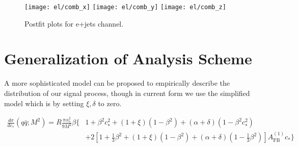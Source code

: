 \begin{figure}[hbt]
  \begin{center}
    \texttt{[image: el/comb\_x]}
    \texttt{[image: el/comb\_y]}
    \texttt{[image: el/comb\_z]}
  \caption{\small Postfit plots for e+jets channel.}
    \label{fig:el_postfit}
  \end{center}
\end{figure}



\clearpage
\section{Generalization of Analysis Scheme}
A more sophisticated model can be proposed to empirically describe the distribution of our signal process, though in current form we use the simplified model which is by setting $\xi,\delta$ to zero.

\begin{align}
\frac{d\sigma}{dc_*}(q\bar q;M^2) = R\frac{\pi\alpha_s^2}{9M^2}\beta\biggl\lbrace&1+\beta^2c_*^2+\left(1+\xi\right)\left(1-\beta^2\right)+\left(\alpha+\delta\right)\left(1-\beta^2c_*^2\right) \nonumber \\
&+2\left[1+\frac{1}{3}\beta^2+(1+\xi)(1-\beta^2)+\left(\alpha+\delta\right)\left(1-\frac{1}{3}\beta^2\right)\right]A_\mathrm{FB}^{(1)}c_*\biggr\rbrace
\label{eq:qq_general}
\end{align}


